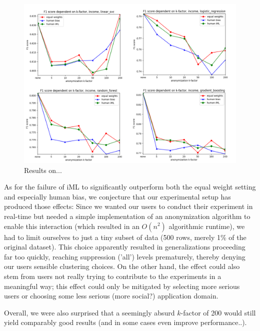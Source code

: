 \documentclass{llncs}
\begin{document}
\begin{figure}[!h]
	\begin{center}
		\hspace*{-0.8cm}
		\includegraphics[width=1.1\textwidth]{figures/income.png}
		\caption{Results on...}
		\label{fig:results_income}
	\end{center}
\end{figure}

As for the failure of iML to significantly outperform both the equal weight setting and especially human bias, we conjecture that our experimental setup has produced those effects: Since we wanted our users to conduct their experiment in real-time but needed a simple implementation of an anonymization algorithm to enable this interaction (which resulted in an $O(n^2)$ algorithmic runtime), we had to limit ourselves to just a tiny subset of data (500 rows, merely 1\% of the original dataset). This choice apparently resulted in generalizations proceeding far too quickly, reaching suppression ('all') levels prematurely, thereby denying our users sensible clustering choices. On the other hand, the effect could also stem from users not really trying to contribute to the experiments in a meaningful way; this effect could only be mitigated by selecting more serious users or choosing some less serious (more social?) application domain.

Overall, we were also surprised that a seemingly absurd $k$-factor of 200 would still yield comparably good results (and in some cases even improve performance..).

\end{document}
